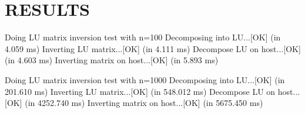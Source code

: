 
\section{RESULTS}\label{sec:results}
Doing LU matrix inversion test with n=100
Decomposing into LU...[OK] (in 4.059 ms)
Inverting LU matrix...[OK] (in 4.111 ms)
Decompose LU on host...[OK] (in 4.603 ms)
Inverting matrix on host...[OK] (in 5.893 ms)



Doing LU matrix inversion test with n=1000
Decomposing into LU...[OK] (in 201.610 ms)
Inverting LU matrix...[OK] (in 548.012 ms)
Decompose LU on host...[OK] (in 4252.740 ms)
Inverting matrix on host...[OK] (in 5675.450 ms)

